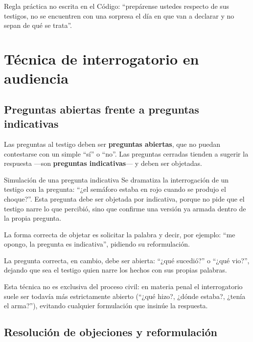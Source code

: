 \documentclass[12pt,oneside]{book}
\begin{document}
\begin{important}
Regla práctica no escrita en el Código: ``prepárense ustedes respecto de sus testigos, no se encuentren con una sorpresa el día en que van a declarar y no sepan de qué se trata''.
\end{important}

\chapter{Técnica de interrogatorio en audiencia}

\section{Preguntas abiertas frente a preguntas indicativas}

Las preguntas al testigo deben ser \textbf{preguntas abiertas}, que no puedan contestarse con un simple ``sí'' o ``no''. Las preguntas cerradas tienden a sugerir la respuesta ---son \textbf{preguntas indicativas}--- y deben ser objetadas.

\begin{example}{Simulación de una pregunta indicativa}
Se dramatiza la interrogación de un testigo con la pregunta: ``¿el semáforo estaba en rojo cuando se produjo el choque?''. Esta pregunta debe ser objetada por indicativa, porque no pide que el testigo narre lo que percibió, sino que confirme una versión ya armada dentro de la propia pregunta.

La forma correcta de objetar es solicitar la palabra y decir, por ejemplo: ``me opongo, la pregunta es indicativa'', pidiendo su reformulación.

La pregunta correcta, en cambio, debe ser abierta: ``¿qué sucedió?'' o ``¿qué vio?'', dejando que sea el testigo quien narre los hechos con sus propias palabras.
\end{example}

Esta técnica no es exclusiva del proceso civil: en materia penal el interrogatorio suele ser todavía más estrictamente abierto (``¿qué hizo?, ¿dónde estaba?, ¿tenía el arma?''), evitando cualquier formulación que insinúe la respuesta.

\section{Resolución de objeciones y reformulación}
\end{document}
